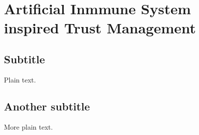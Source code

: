 \documentclass{llncs}
\begin{document}
\section{Artificial Inmmune System inspired Trust Management}

\subsection{Subtitle}

Plain text.

\subsection{Another subtitle}

More plain text.
\end{document}
